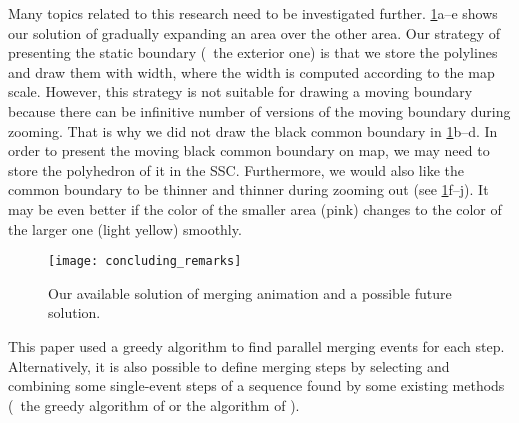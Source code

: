 \documentclass[ijgi,article,submit,moreauthors,pdftex]{Definitions/mdpi}
\begin{document}
Many topics related to this research need to be investigated further.
\fig\ref{fig:smooth_merging}a--e shows our solution of
gradually expanding an area over the other area.
Our strategy of presenting the static boundary (\ie~the exterior one) 
is that we store the polylines and 
draw them with width, 
where the width is computed according to the map scale.
However, this strategy is not suitable for drawing a moving boundary
because there can be infinitive number of versions of the moving boundary
during zooming.
That is why we did not draw the black common boundary in 
\figs\ref{fig:smooth_merging}b--d.
In order to present the moving black common boundary on map, 
we may need to store the polyhedron of it in the SSC.
Furthermore, we would also like the common boundary 
to be thinner and thinner during zooming out
(see \figs\ref{fig:smooth_merging}f--j).
It may be even better if the color of the smaller area (pink)
changes to the color of the larger one (light yellow) smoothly.


\begin{figure}[tb]
\centering
\texttt{[image: concluding\_remarks]}
\caption{
    Our available solution of merging animation 
    and a possible future solution.}
\label{fig:smooth_merging}
\end{figure}







This paper used a greedy algorithm 
to find parallel merging events for each step.
Alternatively, it is also possible to define merging steps 
by selecting and combining some single-event steps of a sequence found 
by some existing methods
(\eg~the greedy algorithm of \citet{vanOosterom2005}
or the \Astar algorithm of \citet[]{Peng2019Thesis}).
\end{document}
